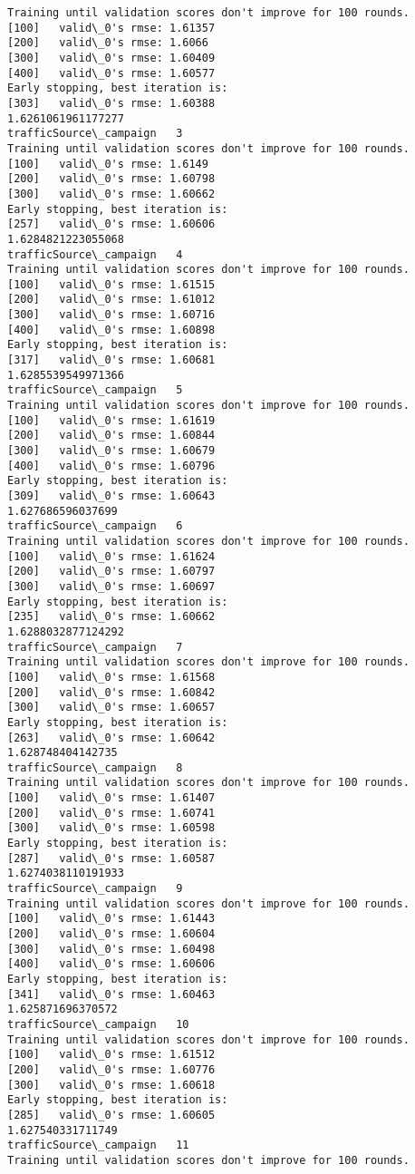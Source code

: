 \documentclass[11pt]{article}
\begin{document}
\begin{Verbatim}[commandchars=\\\{\}]
Training until validation scores don't improve for 100 rounds.
[100]	valid\_0's rmse: 1.61357
[200]	valid\_0's rmse: 1.6066
[300]	valid\_0's rmse: 1.60409
[400]	valid\_0's rmse: 1.60577
Early stopping, best iteration is:
[303]	valid\_0's rmse: 1.60388
1.6261061961177277
trafficSource\_campaign   3
Training until validation scores don't improve for 100 rounds.
[100]	valid\_0's rmse: 1.6149
[200]	valid\_0's rmse: 1.60798
[300]	valid\_0's rmse: 1.60662
Early stopping, best iteration is:
[257]	valid\_0's rmse: 1.60606
1.6284821223055068
trafficSource\_campaign   4
Training until validation scores don't improve for 100 rounds.
[100]	valid\_0's rmse: 1.61515
[200]	valid\_0's rmse: 1.61012
[300]	valid\_0's rmse: 1.60716
[400]	valid\_0's rmse: 1.60898
Early stopping, best iteration is:
[317]	valid\_0's rmse: 1.60681
1.6285539549971366
trafficSource\_campaign   5
Training until validation scores don't improve for 100 rounds.
[100]	valid\_0's rmse: 1.61619
[200]	valid\_0's rmse: 1.60844
[300]	valid\_0's rmse: 1.60679
[400]	valid\_0's rmse: 1.60796
Early stopping, best iteration is:
[309]	valid\_0's rmse: 1.60643
1.627686596037699
trafficSource\_campaign   6
Training until validation scores don't improve for 100 rounds.
[100]	valid\_0's rmse: 1.61624
[200]	valid\_0's rmse: 1.60797
[300]	valid\_0's rmse: 1.60697
Early stopping, best iteration is:
[235]	valid\_0's rmse: 1.60662
1.6288032877124292
trafficSource\_campaign   7
Training until validation scores don't improve for 100 rounds.
[100]	valid\_0's rmse: 1.61568
[200]	valid\_0's rmse: 1.60842
[300]	valid\_0's rmse: 1.60657
Early stopping, best iteration is:
[263]	valid\_0's rmse: 1.60642
1.628748404142735
trafficSource\_campaign   8
Training until validation scores don't improve for 100 rounds.
[100]	valid\_0's rmse: 1.61407
[200]	valid\_0's rmse: 1.60741
[300]	valid\_0's rmse: 1.60598
Early stopping, best iteration is:
[287]	valid\_0's rmse: 1.60587
1.6274038110191933
trafficSource\_campaign   9
Training until validation scores don't improve for 100 rounds.
[100]	valid\_0's rmse: 1.61443
[200]	valid\_0's rmse: 1.60604
[300]	valid\_0's rmse: 1.60498
[400]	valid\_0's rmse: 1.60606
Early stopping, best iteration is:
[341]	valid\_0's rmse: 1.60463
1.625871696370572
trafficSource\_campaign   10
Training until validation scores don't improve for 100 rounds.
[100]	valid\_0's rmse: 1.61512
[200]	valid\_0's rmse: 1.60776
[300]	valid\_0's rmse: 1.60618
Early stopping, best iteration is:
[285]	valid\_0's rmse: 1.60605
1.627540331711749
trafficSource\_campaign   11
Training until validation scores don't improve for 100 rounds.

\end{Verbatim}
\end{document}
